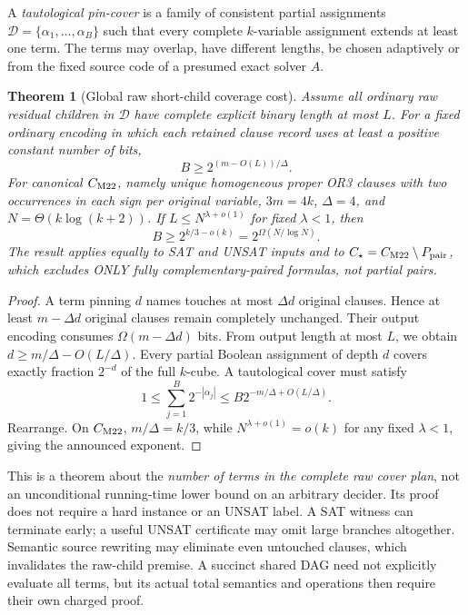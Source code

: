 \documentclass[11pt]{article}
\newtheorem{theorem}{Theorem}
\begin{document}
A \emph{tautological pin-cover} is a family of consistent
partial assignments $\mathcal D=\{\alpha_1,\ldots,\alpha_B\}$
such that every complete $k$-variable assignment extends
at least one term. The terms may overlap, have different
lengths, be chosen adaptively or from the fixed source code
of a presumed exact solver $A$.
\begin{theorem}[Global raw short-child coverage cost]
Assume all ordinary raw residual children in $\mathcal D$
have complete explicit binary length at most $L$.
For a fixed ordinary encoding in which each retained clause
record uses at least a positive constant number of bits,
\[
 \boxed{B\ge2^{(m-O(L))/\Delta}}.
\]
For canonical $C_{\rm M22}$, namely unique homogeneous
proper OR3 clauses with two occurrences in each sign
per original variable,
$3m=4k$, $\Delta=4$, and
$N=\Theta(k\log(k+2))$. If
$L\le N^{\lambda+o(1)}$ for fixed $\lambda<1$, then
\[
 \boxed{ B\ge 2^{k/3-o(k)}=2^{\Omega(N/\log N)}}.
\]
The result applies equally to SAT and UNSAT inputs and
to $C_\star=C_{\rm M22}\setminus P_{\rm pair}$, which
excludes ONLY fully complementary-paired formulas,
not partial pairs.
\end{theorem}
\begin{proof}
A term pinning $d$ names touches at most $\Delta d$
original clauses. Hence at least $m-\Delta d$ original
clauses remain completely unchanged. Their output
encoding consumes $\Omega(m-\Delta d)$ bits.
From output length at most $L$, we obtain
$d\ge m/\Delta-O(L/\Delta)$.
Every partial Boolean assignment of depth $d$ covers
exactly fraction $2^{-d}$ of the full $k$-cube.
A tautological cover must satisfy
\[
 1\le\sum_{j=1}^B2^{-|\alpha_j|}
   \le B2^{-m/\Delta+O(L/\Delta)}.
\]
Rearrange. On $C_{\rm M22}$,
$m/\Delta=k/3$, while
$N^{\lambda+o(1)}=o(k)$ for any fixed $\lambda<1$,
giving the announced exponent.
\end{proof}
This is a theorem about the \emph{number of terms in
the complete raw cover plan}, not an unconditional
running-time lower bound on an arbitrary decider.
Its proof does not require a hard instance or an UNSAT
label. A SAT witness can terminate early; a useful
UNSAT certificate may omit large branches altogether.
Semantic source rewriting may eliminate even untouched
clauses, which invalidates the raw-child premise.
A succinct shared DAG need not explicitly evaluate
all terms, but its actual total semantics and operations
then require their own charged proof.
\end{document}
